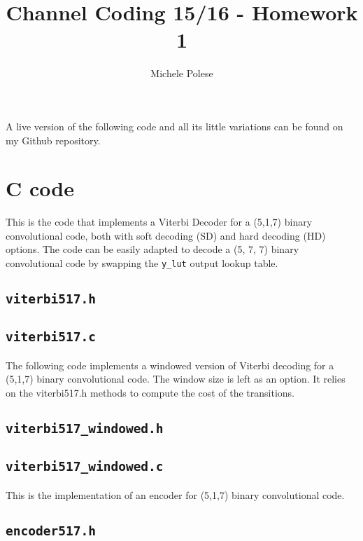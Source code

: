 \documentclass[10pt]{article}
\numberwithin{equation}{section}
\begin{document}
\title{Channel Coding 15/16 - Homework 1}
\author{Michele Polese}

\maketitle

A live version of the following code and all its little variations can be found on my Github repository.

\section*{C code}

This is the code that implements a Viterbi Decoder for a (5,1,7) binary convolutional code, both with soft decoding (SD) and hard decoding (HD) options. The code can be easily adapted to decode a (5, 7, 7) binary convolutional code by swapping the \texttt{y\_lut} output lookup table.
\subsection*{\texttt{viterbi517.h}}

\subsection*{\texttt{viterbi517.c}}


The following code implements a windowed version of Viterbi decoding for a (5,1,7) binary convolutional code. The window size is left as an option. It relies on the viterbi517.h methods to compute the cost of the transitions.

\subsection*{\texttt{viterbi517\_windowed.h}}

\clearpage
\subsection*{\texttt{viterbi517\_windowed.c}}


This is the implementation of an encoder for (5,1,7) binary convolutional code.

\subsection*{\texttt{encoder517.h}}

\end{document}
